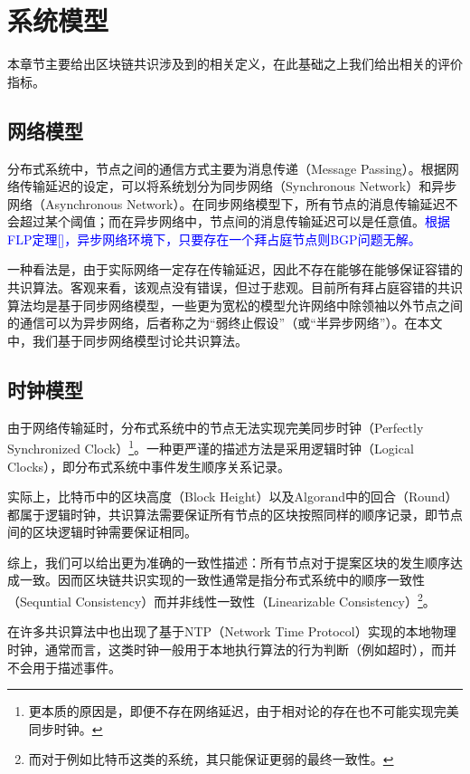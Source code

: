 \section{系统模型}
本章节主要给出区块链共识涉及到的相关定义，在此基础之上我们给出相关的评价指标。

\subsection{网络模型}
分布式系统中，节点之间的通信方式主要为消息传递（Message Passing）。根据网络传输延迟的设定，可以将系统划分为同步网络（Synchronous Network）和异步网络（Asynchronous Network）。在同步网络模型下，所有节点的消息传输延迟不会超过某个阈值；而在异步网络中，节点间的消息传输延迟可以是任意值。\textcolor{blue}{根据FLP定理[]，异步网络环境下，只要存在一个拜占庭节点则BGP问题无解。}

一种看法是，由于实际网络一定存在传输延迟，因此不存在能够在能够保证容错的共识算法。客观来看，该观点没有错误，但过于悲观。目前所有拜占庭容错的共识算法均是基于同步网络模型，一些更为宽松的模型允许网络中除领袖以外节点之间的通信可以为异步网络，后者称之为“弱终止假设”（或“半异步网络”）\cite{castro1999practical}。在本文中，我们基于同步网络模型讨论共识算法。

\subsection{时钟模型}

由于网络传输延时，分布式系统中的节点无法实现完美同步时钟（Perfectly Synchronized Clock）\footnote{更本质的原因是，即便不存在网络延迟，由于相对论的存在也不可能实现完美同步时钟。}。一种更严谨的描述方法是采用逻辑时钟（Logical Clocks）\cite{lamport1978time}，即分布式系统中事件发生顺序关系记录。

实际上，比特币中的区块高度（Block Height）以及Algorand中的回合（Round）都属于逻辑时钟，共识算法需要保证所有节点的区块按照同样的顺序记录，即节点间的区块逻辑时钟需要保证相同。

综上，我们可以给出更为准确的一致性描述：所有节点对于提案区块的发生顺序达成一致。因而区块链共识实现的一致性通常是指分布式系统中的顺序一致性（Sequntial Consistency）而并非线性一致性（Linearizable Consistency）\footnote{而对于例如比特币这类的系统，其只能保证更弱的最终一致性。}。

在许多共识算法中也出现了基于NTP（Network Time Protocol）实现的本地物理时钟\cite{gilad2017algorand}，通常而言，这类时钟一般用于本地执行算法的行为判断（例如超时），而并不会用于描述事件。

